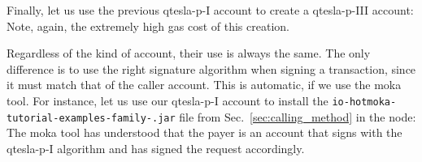 Finally, let us use the previous qtesla-p-I account to create a qtesla-p-III account:
%
%
%
Note, again, the extremely high gas cost of this creation.

Regardless of the kind of account, their use is always the same.
The only difference is to use the right signature algorithm when signing
a transaction, since it must match that of the caller account. This is automatic, if we
use the moka tool. For instance, let us use our qtesla-p-I account to install
the \texttt{io-hotmoka-tutorial-examples-family-\hotmokaVersion{}.jar} file from
Sec.~\ref{sec:calling_method} in the node:
%
%
The moka tool has understood that the payer is an account that signs with the
qtesla-p-I algorithm and has signed the request accordingly.